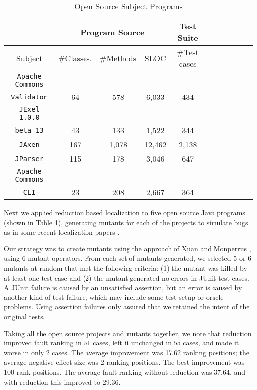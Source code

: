 


\begin{table}
{\scriptsize
\begin{center}
\begin{tabular}{|c||c|c|c|c|c||c|c|c|c|c|}
\hline
\hline
& \multicolumn{3}{|c|}{Program Source} & \multicolumn{1}{|c|}{Test Suite} \\
\hline
Subject & \#Classes. & \#Methods & SLOC & \#Test cases \\
\hline
\hline
{\tt Apache Commons} & & & & \\
{\tt Validator} & 64 & 578 & 6,033 & 434 \\
\hline
{\tt JExel 1.0.0} & & & & \\
{\tt beta 13} & 43 & 133 & 1,522	 & 344  \\
\hline
{\tt JAxen} & 167 & 1,078 & 12,462 & 2,138\\
\hline
{\tt JParser} & 115 & 178 & 3,046 & 647 \\
\hline
{\tt Apache Commons} & & & & \\
{\tt CLI} & 23 & 208 & 2,667 & 364 \\ 
\hline
\hline
\end{tabular}
\end{center}
}
\caption{Open Source Subject Programs}
\label{tab:opensourcesubs}
\end{table}



Next we applied reduction based localization to five open source Java
programs (shown in Table \ref{tab:opensourcesubs}), generating mutants
for each of the projects to simulate bugs as in some recent
localization papers \cite{mutant,PureTest}.





 
Our strategy was to create mutants using the approach of Xuan and
Monperrus \cite{PureTest}, using 6 mutant operators.  From each set of
mutants generated, we selected 5 or 6 mutants at random that met the
following criteria: (1) the mutant was killed by at least one test
case and (2) the mutant generated no errors in JUnit test cases.  A
JUnit failure is caused by an unsatisfied assertion, but an error is
caused by another kind of test failure, which may include some test
setup or oracle problems.  Using assertion failures only assured that
we retained the intent of the original tests.

Taking all the open source projects and mutants together, we note that
reduction improved fault ranking in 51 cases, left it unchanged in 55
cases, and made it worse in only 2 cases.  The average improvement was
17.62 ranking positions; the average negative effect size was 2
ranking positions.  The best improvement was 100 rank positions.  The
average fault ranking without reduction was 37.64, and with reduction
this improved to 29.36.
